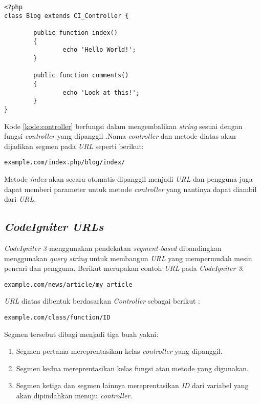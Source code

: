 \begin{lstlisting}[caption=Contoh \textit{controller} pada \textit{CodeIgniter 3}, label=kode:controller]
<?php
class Blog extends CI_Controller {

        public function index()
        {
                echo 'Hello World!';
        }

        public function comments()
        {
                echo 'Look at this!';
        }
}
\end{lstlisting}

Kode \ref{kode:controller} berfungsi dalam mengembalikan \textit{string} sesuai dengan fungsi \textit{controller} yang dipanggil .Nama \textit{controller} dan metode diatas akan dijadikan segmen pada \textit{URL} seperti berikut:

\begin{center}
\verb|example.com/index.php/blog/index/|
\end{center}

Metode \textit{index} akan secara otomatis dipanggil menjadi \textit{URL} dan pengguna juga dapat memberi parameter untuk metode \textit{controller} yang nantinya dapat diambil dari \textit{URL}.

\subsection{\textit{CodeIgniter URLs}}

\textit{CodeIgniter 3} menggunakan pendekatan \textit{segment-based} dibandingkan menggunakan \textit{query string} untuk membangun \textit{URL} yang mempermudah mesin pencari dan pengguna. Berikut merupakan contoh \textit{URL} pada \textit{CodeIgniter 3}:

\begin{center}
\verb|example.com/news/article/my_article|
\end{center}

\textit{URL} diatas dibentuk berdasarkan \textit{Controller} sebagai berikut :

\begin{center}
\verb|example.com/class/function/ID|
\end{center}

Segmen tersebut dibagi menjadi tiga buah yakni:
\begin{enumerate}
\item Segmen pertama mereprentasikan kelas \textit{controller} yang dipanggil.
\item Segmen kedua mereprentasikan kelas fungsi atau metode yang digunakan.
\item Segmen ketiga dan segmen lainnya mereprentasikan \textit{ID} dari variabel yang akan dipindahkan menuju \textit{controller}.
\end{enumerate}


